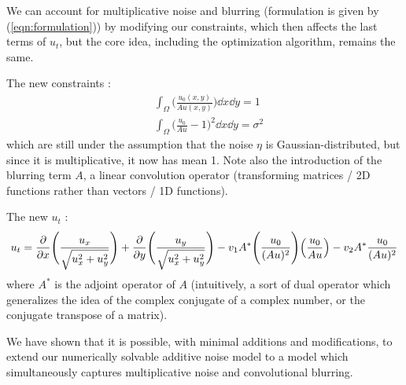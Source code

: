 \documentclass[11pt, oneside]{article}   	%
\begin{document}
We can account for multiplicative noise and blurring (formulation is given by (\ref{eqn:formulation})) by modifying our
constraints, which then affects the last terms of $u_t$, but the core idea,
including the optimization algorithm, remains the same.

The new constraints \cite{rudin2003}:
\begin{align}
  &\int_\Omega \Bigg(\frac{u_0(x,y)}{Au(x,y)} \Bigg) \dd{x} \dd{y} = 1 \\
  &\int_\Omega \Big(\frac{u_0}{Au} - 1 \Big)^2 \dd{x} \dd{y} = \sigma^2
\end{align}
which are still under the assumption that the noise $\eta$ is
Gaussian-distributed, but since it is multiplicative, it now has mean 1. Note
also the introduction of the blurring term $A$, a linear convolution operator
(transforming matrices / 2D functions rather than vectors / 1D functions).

The new $u_t$ \cite{rudin2003}:
\begin{equation}
  u_t = \pdv{}{x} \Bigg(\frac{u_x}{\sqrt{u_x^2+u_y^2}} \Bigg)
  + \pdv{}{y} \Bigg(\frac{u_y}{\sqrt{u_x^2+u_y^2}} \Bigg)
  - v_1A^*\Bigg(\frac{u_0}{(Au)^2} \Bigg) \Big(\frac{u_0}{Au} \Big)
  - v_2A^*\frac{u_0}{(Au)^2}
\end{equation}
where $A^*$ is the adjoint operator of $A$ (intuitively, a sort of dual operator
which generalizes the idea of the complex conjugate of a complex number, or the
conjugate transpose of a matrix).

We have shown that it is possible, with minimal additions and modifications, to
extend our numerically solvable additive noise model to a model which
simultaneously captures multiplicative noise and convolutional blurring.
\end{document}

